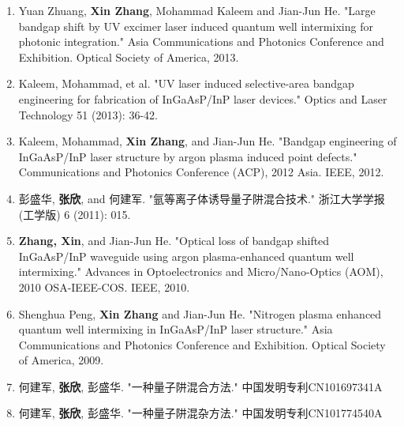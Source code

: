 \documentclass{ZJUthesis}
\begin{document}
\begin{publications}
\begin{enumerate}
\item{Yuan Zhuang, \textbf{Xin Zhang}, Mohammad Kaleem and Jian-Jun He. "Large bandgap shift by UV excimer laser induced quantum well intermixing for photonic integration." Asia Communications and Photonics Conference and Exhibition. Optical Society of America, 2013.}
\item{Kaleem, Mohammad, et al. "UV laser induced selective-area bandgap engineering for fabrication of InGaAsP/InP laser devices." Optics and Laser Technology 51 (2013): 36-42.}
\item{Kaleem, Mohammad, \textbf{Xin Zhang}, and Jian-Jun He. "Bandgap engineering of InGaAsP/InP laser structure by argon plasma induced point defects." Communications and Photonics Conference (ACP), 2012 Asia. IEEE, 2012.}
\item{彭盛华, \textbf{张欣}, and 何建军. "氩等离子体诱导量子阱混合技术." 浙江大学学报 (工学版) 6 (2011): 015.}
\item{\textbf{Zhang, Xin}, and Jian-Jun He. "Optical loss of bandgap shifted InGaAsP/InP waveguide using argon plasma-enhanced quantum well intermixing." Advances in Optoelectronics and Micro/Nano-Optics (AOM), 2010 OSA-IEEE-COS. IEEE, 2010.}
\item{Shenghua Peng, \textbf{Xin Zhang} and Jian-Jun He. "Nitrogen plasma enhanced quantum well intermixing in InGaAsP/InP laser structure." Asia Communications and Photonics Conference and Exhibition. Optical Society of America, 2009.}
\item{何建军, \textbf{张欣}, 彭盛华. "一种量子阱混合方法." 中国发明专利CN101697341A}
\item{何建军, \textbf{张欣}, 彭盛华. "一种量子阱混杂方法." 中国发明专利CN101774540A}
\end{enumerate}
\end{publications}
\end{document}
